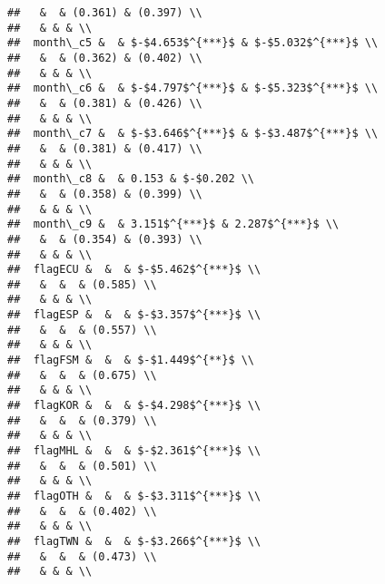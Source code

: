 \documentclass[11pt,]{article}
\begin{document}
\begin{verbatim}
##   &  & (0.361) & (0.397) \\ 
##   & & & \\ 
##  month\_c5 &  & $-$4.653$^{***}$ & $-$5.032$^{***}$ \\ 
##   &  & (0.362) & (0.402) \\ 
##   & & & \\ 
##  month\_c6 &  & $-$4.797$^{***}$ & $-$5.323$^{***}$ \\ 
##   &  & (0.381) & (0.426) \\ 
##   & & & \\ 
##  month\_c7 &  & $-$3.646$^{***}$ & $-$3.487$^{***}$ \\ 
##   &  & (0.381) & (0.417) \\ 
##   & & & \\ 
##  month\_c8 &  & 0.153 & $-$0.202 \\ 
##   &  & (0.358) & (0.399) \\ 
##   & & & \\ 
##  month\_c9 &  & 3.151$^{***}$ & 2.287$^{***}$ \\ 
##   &  & (0.354) & (0.393) \\ 
##   & & & \\ 
##  flagECU &  &  & $-$5.462$^{***}$ \\ 
##   &  &  & (0.585) \\ 
##   & & & \\ 
##  flagESP &  &  & $-$3.357$^{***}$ \\ 
##   &  &  & (0.557) \\ 
##   & & & \\ 
##  flagFSM &  &  & $-$1.449$^{**}$ \\ 
##   &  &  & (0.675) \\ 
##   & & & \\ 
##  flagKOR &  &  & $-$4.298$^{***}$ \\ 
##   &  &  & (0.379) \\ 
##   & & & \\ 
##  flagMHL &  &  & $-$2.361$^{***}$ \\ 
##   &  &  & (0.501) \\ 
##   & & & \\ 
##  flagOTH &  &  & $-$3.311$^{***}$ \\ 
##   &  &  & (0.402) \\ 
##   & & & \\ 
##  flagTWN &  &  & $-$3.266$^{***}$ \\ 
##   &  &  & (0.473) \\ 
##   & & & \\ 

\end{verbatim}
\end{document}
